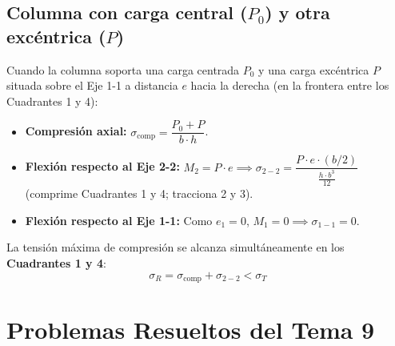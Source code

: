 \subsection{Columna con carga central ($P_0$) y otra excéntrica ($P$)}
Cuando la columna soporta una carga centrada $P_0$ y una carga excéntrica $P$ situada sobre el Eje 1-1 a distancia $e$ hacia la derecha (en la frontera entre los Cuadrantes 1 y 4):
\begin{itemize}
    \item \textbf{Compresión axial:} $\sigma_{\text{comp}} = \dfrac{P_0 + P}{b\cdot h}$.
    \item \textbf{Flexión respecto al Eje 2-2:} $M_2 = P\cdot e \implies \sigma_{2-2} = \dfrac{P\cdot e\cdot(b/2)}{\frac{h\cdot b^3}{12}}$ (comprime Cuadrantes 1 y 4; tracciona 2 y 3).
    \item \textbf{Flexión respecto al Eje 1-1:} Como $e_1 = 0$, $M_1 = 0 \implies \sigma_{1-1} = 0$.
\end{itemize}
La tensión máxima de compresión se alcanza simultáneamente en los \textbf{Cuadrantes 1 y 4}:
\begin{equation}
    \sigma_R = \sigma_{\text{comp}} + \sigma_{2-2} < \sigma_T
    \label{eq:t9_central_excentrica}
\end{equation}

\section{Problemas Resueltos del Tema 9}

